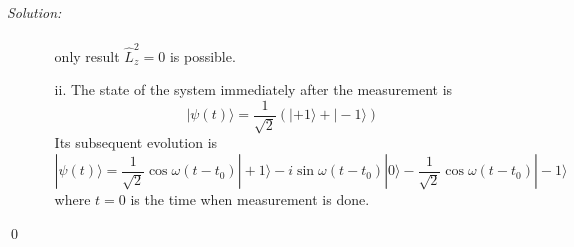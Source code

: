 \documentclass[12pt,a4paper]{article}
\newenvironment{sol}
    {\emph{Solution:}
    }
    {
    \qed
    }
\begin{document}
\begin{sol}
\begin{itemize}
\begin{itemize}
\begin{gather}
\end{gather}
only result $\hat{L}_z^2=0$ is possible.
\item[ii.] The state of the system immediately after the measurement is
\begin{equation}
|\psi(t)\rangle=\frac{1}{\sqrt{2}}(|+1\rangle+|-1\rangle)
\end{equation}
Its subsequent evolution is
\begin{equation}
|\psi(t)\rangle=\frac{1}{\sqrt{2}}\cos\omega(t-t_0)|+1\rangle-i\sin\omega(t-t_0)|0\rangle-\frac{1}{\sqrt{2}}\cos\omega(t-t_0)|-1\rangle
\end{equation}
where $t=0$ is the time when measurement is done.
\end{itemize}
\end{itemize}
\end{sol}
\end{document}
